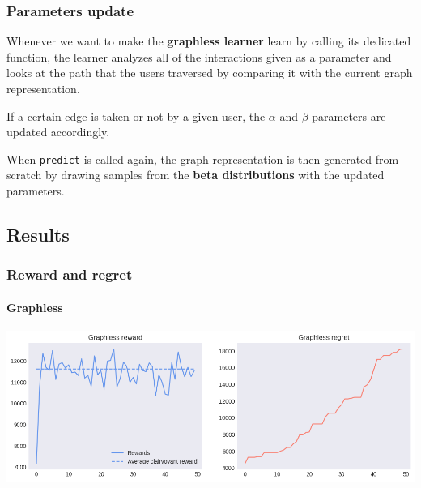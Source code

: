 
\begin{frame}

\frametitle{Parameters update}

Whenever we want to make the \textbf{graphless learner} learn by calling its dedicated function, the learner analyzes all of the interactions given as a parameter and looks at the path that the users traversed by comparing it with the current graph representation.

If a certain edge is taken or not by a given user, the $\alpha$ and $\beta$ parameters are updated accordingly.

When \texttt{predict} is called again, the graph representation is then generated from scratch by drawing samples from the \textbf{beta distributions} with the updated parameters.

\end{frame}


\subsection{Results}


\begin{frame}[plain]

\frametitle{Reward and regret}
\framesubtitle{Graphless}

\begin{center}
	\includegraphics[scale=0.4]{img/Graphs/graphless/image1.png}
\end{center}

\end{frame}


